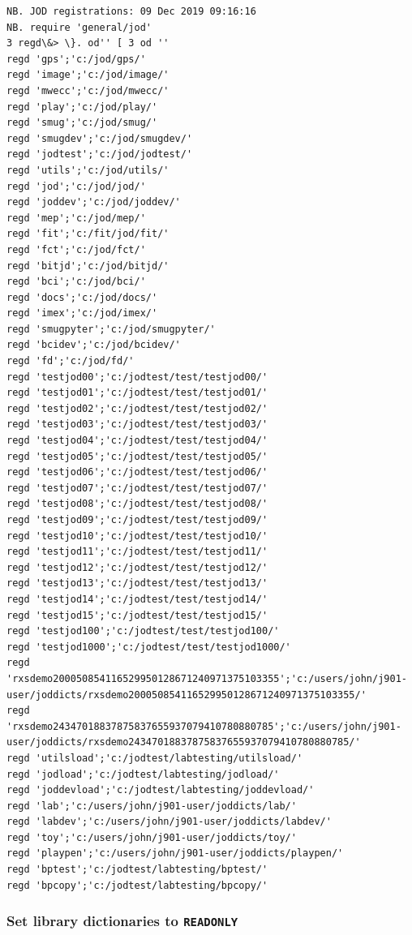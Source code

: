 \documentclass[11pt,letter,landscape]{article}
\begin{document}
    \begin{Verbatim}[commandchars=\\\{\}]
NB. JOD registrations: 09 Dec 2019 09:16:16
NB. require 'general/jod'
3 regd\&> \}. od'' [ 3 od ''
regd 'gps';'c:/jod/gps/'
regd 'image';'c:/jod/image/'
regd 'mwecc';'c:/jod/mwecc/'
regd 'play';'c:/jod/play/'
regd 'smug';'c:/jod/smug/'
regd 'smugdev';'c:/jod/smugdev/'
regd 'jodtest';'c:/jod/jodtest/'
regd 'utils';'c:/jod/utils/'
regd 'jod';'c:/jod/jod/'
regd 'joddev';'c:/jod/joddev/'
regd 'mep';'c:/jod/mep/'
regd 'fit';'c:/fit/jod/fit/'
regd 'fct';'c:/jod/fct/'
regd 'bitjd';'c:/jod/bitjd/'
regd 'bci';'c:/jod/bci/'
regd 'docs';'c:/jod/docs/'
regd 'imex';'c:/jod/imex/'
regd 'smugpyter';'c:/jod/smugpyter/'
regd 'bcidev';'c:/jod/bcidev/'
regd 'fd';'c:/jod/fd/'
regd 'testjod00';'c:/jodtest/test/testjod00/'
regd 'testjod01';'c:/jodtest/test/testjod01/'
regd 'testjod02';'c:/jodtest/test/testjod02/'
regd 'testjod03';'c:/jodtest/test/testjod03/'
regd 'testjod04';'c:/jodtest/test/testjod04/'
regd 'testjod05';'c:/jodtest/test/testjod05/'
regd 'testjod06';'c:/jodtest/test/testjod06/'
regd 'testjod07';'c:/jodtest/test/testjod07/'
regd 'testjod08';'c:/jodtest/test/testjod08/'
regd 'testjod09';'c:/jodtest/test/testjod09/'
regd 'testjod10';'c:/jodtest/test/testjod10/'
regd 'testjod11';'c:/jodtest/test/testjod11/'
regd 'testjod12';'c:/jodtest/test/testjod12/'
regd 'testjod13';'c:/jodtest/test/testjod13/'
regd 'testjod14';'c:/jodtest/test/testjod14/'
regd 'testjod15';'c:/jodtest/test/testjod15/'
regd 'testjod100';'c:/jodtest/test/testjod100/'
regd 'testjod1000';'c:/jodtest/test/testjod1000/'
regd 'rxsdemo200050854116529950128671240971375103355';'c:/users/john/j901-user/joddicts/rxsdemo200050854116529950128671240971375103355/'
regd 'rxsdemo24347018837875837655937079410780880785';'c:/users/john/j901-user/joddicts/rxsdemo24347018837875837655937079410780880785/'
regd 'utilsload';'c:/jodtest/labtesting/utilsload/'
regd 'jodload';'c:/jodtest/labtesting/jodload/'
regd 'joddevload';'c:/jodtest/labtesting/joddevload/'
regd 'lab';'c:/users/john/j901-user/joddicts/lab/'
regd 'labdev';'c:/users/john/j901-user/joddicts/labdev/'
regd 'toy';'c:/users/john/j901-user/joddicts/toy/'
regd 'playpen';'c:/users/john/j901-user/joddicts/playpen/'
regd 'bptest';'c:/jodtest/labtesting/bptest/'
regd 'bpcopy';'c:/jodtest/labtesting/bpcopy/'

    \end{Verbatim}

    \subsubsection{\texorpdfstring{Set library dictionaries to
\texttt{READONLY}}{Set library dictionaries to READONLY}}\label{set-library-dictionaries-to-readonly}
\end{document}
